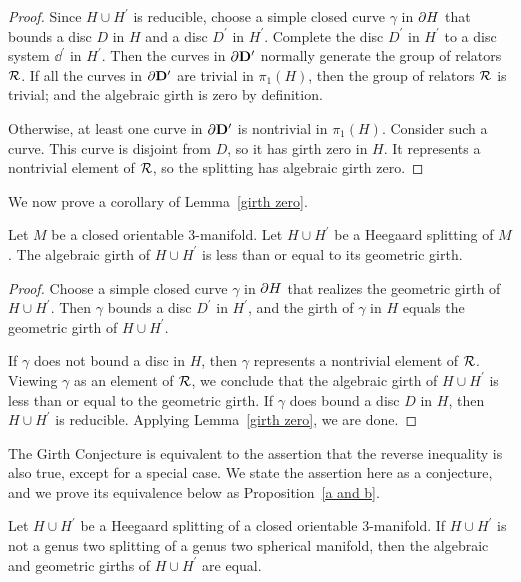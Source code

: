\begin{proof}
Since $H\cup H^{\prime}$ is reducible, choose a simple closed curve $\gamma$ in $\partial H$ that bounds a disc $D$ in $H$ and a disc $D^\prime$ in $H^\prime$.  Complete the disc $D^\prime$ in $H^\prime$ to a disc system $\dd^{\prime}$ in $H^\prime$.  Then the curves in $\partial \mathbf{D}^{\prime}$ normally generate the group of relators $\mathcal{R}$.  If all the curves in $\partial\mathbf{D}^{\prime}$ are trivial in $\pi_1(H)$, then the group of relators $\mathcal{R}$ is trivial; and the algebraic girth is zero by definition.

Otherwise, at least one curve in $\partial\mathbf{D}^{\prime}$ is nontrivial in $\pi_1(H)$.  Consider such a curve.  This curve is disjoint from $D$, so it has girth zero in $H$.  It represents a nontrivial element of $\mathcal{R}$, so the splitting has algebraic girth zero.
\end{proof}

We now prove a corollary of Lemma~\ref{girth zero}.

\begin{corollary}
\label{easy inequality}
Let $M$ be a closed orientable 3-manifold.  Let $H\cup H^\prime$ be a Heegaard splitting of $M$.  The algebraic girth of $H\cup H^\prime$ is less than or equal to its geometric girth.
\end{corollary}

\begin{proof}
Choose a simple closed curve $\gamma$ in $\partial H$ that realizes 
the geometric girth of $H\cup H^\prime$. Then $\gamma$ bounds a disc $D^\prime$ in $H^\prime$, and the girth of $\gamma$ in $H$ equals the geometric girth of $H\cup H^\prime$.

If $\gamma$ does not bound a disc in $H$, then $\gamma$ represents a nontrivial element of $\mathcal{R}$.  Viewing $\gamma$ as an element of $\mathcal{R}$, we conclude that the algebraic girth of $H\cup H^\prime$ is less than or
equal to the geometric girth.  If $\gamma$ does bound a disc $D$ in $H$, then $H\cup H^{\prime}$ is reducible.  Applying Lemma~\ref{girth zero}, we are done.
\end{proof}

The Girth Conjecture is equivalent to the assertion that the
reverse inequality is also true, except for a special case.  
We state the assertion here as a conjecture, and we prove its
equivalence below as Proposition~\ref{a and b}.

\begin{conjecture}
\label{ag girth conjecture}
Let $H\cup H^\prime$ be a Heegaard splitting of a closed orientable 
$3$-manifold.  If $H\cup H^\prime$ is not a genus two splitting of a genus two spherical manifold, then the algebraic and geometric girths of $H\cup H^\prime$ are equal.
\end{conjecture}

